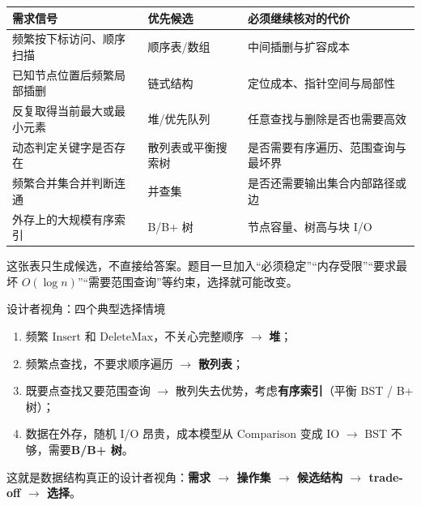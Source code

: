 \documentclass[11pt,a4paper,openany]{ctexbook}
\newcommand{\key}[1]{\textbf{\color{deep}#1}}
\begin{document}
\begin{longtable}{p{4.4cm}p{3.7cm}p{\dimexpr\linewidth-9.37cm\relax}}
\toprule
\textbf{需求信号} & \textbf{优先候选} & \textbf{必须继续核对的代价}\\
\midrule
频繁按下标访问、顺序扫描 & 顺序表/数组 & 中间插删与扩容成本\\
\midrule
已知节点位置后频繁局部插删 & 链式结构 & 定位成本、指针空间与局部性\\
\midrule
反复取得当前最大或最小元素 & 堆/优先队列 & 任意查找与删除是否也需要高效\\
\midrule
动态判定关键字是否存在 & 散列表或平衡搜索树 & 是否需要有序遍历、范围查询与最坏界\\
\midrule
频繁合并集合并判断连通 & 并查集 & 是否还需要输出集合内部路径或边\\
\midrule
外存上的大规模有序索引 & B/B+ 树 & 节点容量、树高与块 I/O\\
\bottomrule
\end{longtable}

这张表只生成候选，不直接给答案。题目一旦加入“必须稳定”“内存受限”“要求最坏 $O(\log n)$”“需要范围查询”等约束，选择就可能改变。

\begin{methodbox}{设计者视角：四个典型选择情境}
\begin{enumerate}
  \item 频繁 $\text{Insert}$ 和 $\text{DeleteMax}$，不关心完整顺序 $\rightarrow$ \key{堆}；
  \item 频繁点查找，不要求顺序遍历 $\rightarrow$ \key{散列表}；
  \item 既要点查找又要范围查询 $\rightarrow$ 散列失去优势，考虑\key{有序索引}（平衡 BST / B+ 树）；
  \item 数据在外存，随机 I/O 昂贵，成本模型从 $\text{Comparison}$ 变成 $\text{IO}$ $\rightarrow$ BST 不够，需要\key{B/B+ 树}。
\end{enumerate}
这就是数据结构真正的设计者视角：\key{需求 $\rightarrow$ 操作集 $\rightarrow$ 候选结构 $\rightarrow$ trade-off $\rightarrow$ 选择}。
\end{methodbox}
\end{document}
